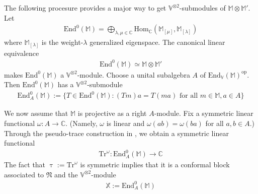 \documentclass[11pt,b5paper,notitlepage]{article}
\theoremstyle{definition}
\theoremstyle{plain}
\newcommand{\Tr}{\mathrm{Tr}}
\newcommand{\End}{\mathrm{End}} %
\newcommand{\Hom}{\mathrm{Hom}}
\newcommand{\Vbb}{\mathbb V}
\newcommand{\Xbb}{\mathbb X}
\newcommand{\Mbb}{\mathbb M}
\newcommand{\Cbb}{\mathbb C}
\newcommand{\<}{\left\langle}
\renewcommand{\>}{\right\rangle}
\newcommand{\fn}{\mathfrak{N}}
\numberwithin{equation}{subsection}
\begin{document}
The following procesure provides a major way to get $\Vbb^{\otimes 2}$-submodules of $\Mbb\otimes\Mbb'$. Let
\begin{align*}
\End^0(\Mbb)=\bigoplus_{\lambda,\mu\in\Cbb}\Hom_\Cbb(\Mbb_{[\mu]},\Mbb_{[\lambda]})
\end{align*}
where $\Mbb_{[\lambda]}$ is the weight-$\lambda$ generalized eigenspace. The canonical linear equivalence
\begin{align*}
\End^0(\Mbb)\simeq\Mbb\otimes\Mbb'
\end{align*}
makes $\End^0(\Mbb)$ a $\Vbb^{\otimes 2}$-module. Choose a unital subalgebra $A$ of $\End_\Vbb(\Mbb)^{\mathrm{op}}$. Then $\End^0(\Mbb)$ has a $\Vbb^{\otimes 2}$-submodule
\begin{align*}
\End_A^0(\Mbb):=\{T\in\End^0(\Mbb):(Tm)a=T(m a)\text{ for all }m\in\Mbb,a\in A\}
\end{align*}

We now assume that $\Mbb$ is projective as a right $A$-module. Fix a symmetric linear functional $\omega:A\rightarrow\Cbb$. (Namely, $\omega$ is linear and $\omega(ab)=\omega(ba)$ for all $a,b\in A$.) Through the pseudo-trace construction in \cite{Ari10}, we obtain a symmetric linear functional
\begin{align*}
\Tr^\omega:\End^0_A(\Mbb)\rightarrow\Cbb
\end{align*}
The fact that $\uptau:=\Tr^\omega$ is symmetric implies that it is a conformal block associated to $\fn$ and the $\Vbb^{\otimes 2}$-module
\begin{align*}
\Xbb:=\End^0_A(\Mbb)
\end{align*}
\end{document}

